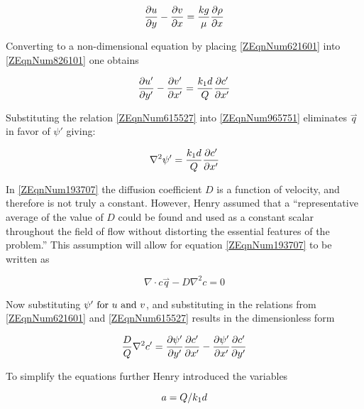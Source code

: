 \begin{equation} \label{ZEqnNum826101} 
    \frac{\partial u}{\partial y} -\frac{\partial v}{\partial x} =
    \frac{kg}{\mu } \frac{\partial \rho}{\partial x} 
\end{equation}

Converting to a non-dimensional equation by placing \eqref{ZEqnNum621601} into
\eqref{ZEqnNum826101} one obtains

\begin{equation} \label{ZEqnNum965751} 
    \frac{\partial u'}{\partial y'}
    -\frac{\partial v'}{\partial x'} =\frac{k_{1} d}{Q} \frac{\partial c'}{\partial x'} 
\end{equation}

Substituting the relation \eqref{ZEqnNum615527} into \eqref{ZEqnNum965751}
eliminates $\stackrel{\rightharpoonup}{q}$ in favor of $\psi '$ giving:

\begin{equation} \label{ZEqnNum299802} \nabla ^{2} \psi '=\frac{k_{1} d}{Q}
\frac{\partial c'}{\partial x'} \end{equation}

In \eqref{ZEqnNum193707} the diffusion coefficient $D$ is a function of velocity, and therefore is
not truly a constant. However, Henry \cite{Henry60} assumed that a ``representative average of the
value of $D$ could be found and used as a constant scalar throughout the field of flow without
distorting the essential features of the problem.'' This assumption will allow for equation
\eqref{ZEqnNum193707} to be written as

\begin{equation} \label{2.15)} \nabla \cdot
c\stackrel{\rightharpoonup}{q}-D\nabla ^{2} c=0 \end{equation}

Now substituting $\psi '\text{ for } u\text{ and } v$, and substituting in the relations
from \eqref{ZEqnNum621601} and \eqref{ZEqnNum615527} results in the
dimensionless form

\begin{equation} \label{ZEqnNum195283} 
    \frac{D}{Q} \nabla ^{2} c'=\frac{\partial \psi'}{\partial y'} 
    \frac{\partial c'}{\partial x'} -\frac{\partial \psi'}{\partial x'} 
    \frac{\partial c'}{\partial y'} 
\end{equation}

To simplify the equations further Henry introduced the variables 

\begin{equation} \label{ZEqnNum517161} 
    a={Q\mathord{\left/ {\vphantom {Q k_{1} d}} \right. \kern-\nulldelimiterspace} k_{1} d} 
\end{equation}

